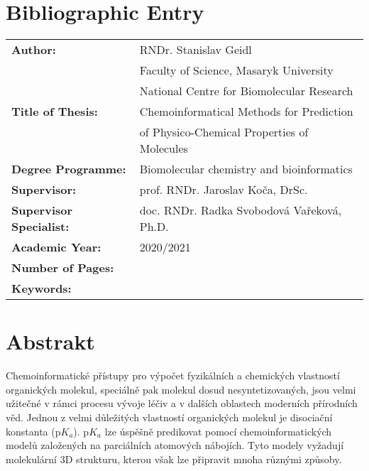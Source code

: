 \documentclass[11pt,b5paper,oneside,final]{book}
\begin{document}
\section*{Bibliographic Entry}
\def\arraystretch{1.5}
\begin{tabular}{ ll } 
  \textbf{Author:}                & RNDr. Stanislav Geidl \\
                                  & Faculty of Science, Masaryk University \\
                                  & National Centre for Biomolecular Research \\
  \textbf{Title of Thesis:}       & Chemoinformatical Methods for Prediction \\
                                  & of Physico-Chemical Properties of Molecules \\ 
  \textbf{Degree Programme:}      & Biomolecular chemistry and bioinformatics \\
  \textbf{Supervisor:}            & prof. RNDr. Jaroslav Koča, DrSc. \\
  \textbf{Supervisor Specialist:} & doc. RNDr. Radka Svobodová Vařeková, Ph.D. \\
  \textbf{Academic Year:}         & 2020/2021 \\
  \textbf{Number of Pages:}       & \\
  \textbf{Keywords:}              &  \\
\end{tabular}
\clearpage

\pagestyle{plain}

\section*{Abstrakt}
Chemoinformatické přístupy pro výpočet fyzikálních a chemických vlastností
organických molekul, speciálně pak molekul dosud nesyntetizovaných, jsou velmi
užitečné v rámci procesu vývoje léčiv a v dalších oblastech moderních přírodních
věd. Jednou z velmi důležitých vlastností organických molekul je disociační
konstanta (p$K_a$). p$K_a$ lze úspěšně predikovat pomocí chemoinformatických
modelů založených na parciálních atomových nábojích. Tyto modely vyžadují
molekulární 3D strukturu, kterou však lze připravit mnoha různými způsoby.
\end{document}

